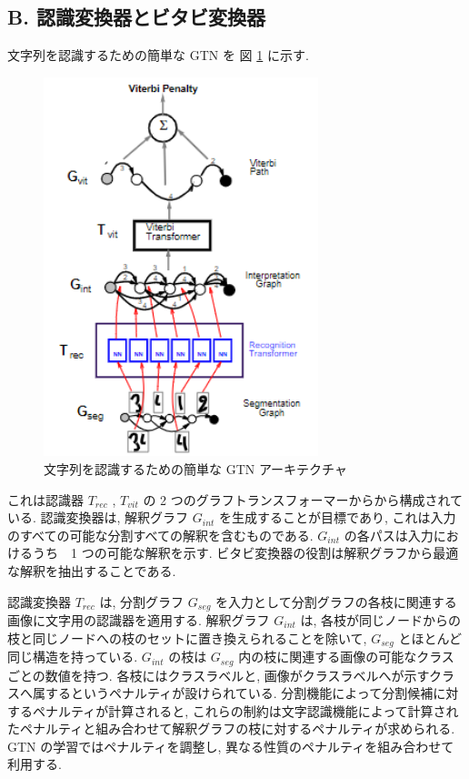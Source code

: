\documentclass[twocolumn]{jarticle}     %
\begin{document}
\subsection*{B. 認識変換器とビタビ変換器}
文字列を認識するための簡単な GTN を 図 \ref{fig:17} に示す.
\begin{figure}[t]
  \centering
  \includegraphics[width=80mm]{assets/17.png}
  \caption{文字列を認識するための簡単な GTN アーキテクチャ}
  \label{fig:17}
\end{figure}
 これは認識器 ${T_{rec}}$ , ${T_{vit}}$ の 2 つのグラフトランスフォーマーからから構成されている. 
認識変換器は, 解釈グラフ $G_{int}$ を生成することが目標であり, これは入力のすべての可能な分割すべての解釈を含むものである. $G_{int}$ の各パスは入力におけるうち　1 つの可能な解釈を示す. ビタビ変換器の役割は解釈グラフから最適な解釈を抽出することである. 
\par
認識変換器 $T_{rec}$ は, 分割グラフ $G_{seg}$ を入力として分割グラフの各枝に関連する画像に文字用の認識器を適用する.
解釈グラフ $G_{int}$ は, 各枝が同じノードからの枝と同じノードへの枝のセットに置き換えられることを除いて, $G_{seg}$ とほとんど同じ構造を持っている. 
$G_{int}$ の枝は $G_{seg}$ 内の枝に関連する画像の可能なクラスごとの数値を持つ.  
各枝にはクラスラベルと, 画像がクラスラベルへが示すクラスへ属するというペナルティが設けられている. 
分割機能によって分割候補に対するペナルティが計算されると, これらの制約は文字認識機能によって計算されたペナルティと組み合わせて解釈グラフの枝に対するペナルティが求められる. GTN の学習ではペナルティを調整し, 異なる性質のペナルティを組み合わせて利用する.
\end{document}
